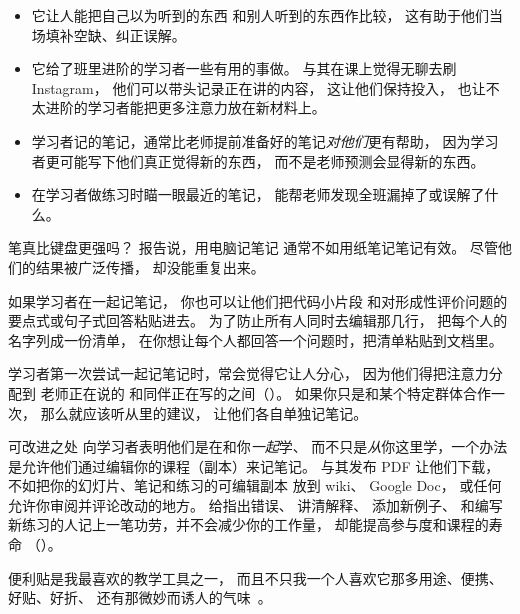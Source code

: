 \begin{itemize}

\item
  它让人能把自己以为听到的东西
  和别人听到的东西作比较，
  这有助于他们当场填补空缺、纠正误解。

\item
  它给了班里进阶的学习者一些有用的事做。
  与其在课上觉得无聊去刷 Instagram，
  他们可以带头记录正在讲的内容，
  这让他们保持投入，
  也让不太进阶的学习者能把更多注意力放在新材料上。

\item
  学习者记的笔记，通常比老师提前准备好的笔记\emph{对他们}更有帮助，
  因为学习者更可能写下他们真正觉得新的东西，
  而不是老师预测会显得新的东西。

\item
  在学习者做练习时瞄一眼最近的笔记，
  能帮老师发现全班漏掉了或误解了什么。

\end{itemize}

\begin{aside}{笔真比键盘更强吗？}
  \cite{Muel2014}报告说，用电脑记笔记
  通常不如用纸笔记笔记有效。
  尽管他们的结果被广泛传播，
  \cite{More2019}却没能重复出来。
\end{aside}

如果学习者在一起记笔记，
你也可以让他们把代码小片段
和对形成性评价问题的要点式或句子式回答粘贴进去。
为了防止所有人同时去编辑那几行，
把每个人的名字列成一份清单，
在你想让每个人都回答一个问题时，把清单粘贴到文档里。

学习者第一次尝试一起记笔记时，常会觉得它让人分心，
因为他们得把注意力分配到
老师正在说的
和同伴正在写的之间（）。
如果你只是和某个特定群体合作一次，
那么就应该听从里的建议，
让他们各自单独记笔记。

\begin{aside}{可改进之处}
  向学习者表明他们是在和你\emph{一起}学、
  而不只是\emph{从}你这里学，一个办法
  是允许他们通过编辑你的课程（副本）来记笔记。
  与其发布 PDF 让他们下载，
  不如把你的幻灯片、笔记和练习的可编辑副本
  放到 wiki、
  Google Doc，
  或任何允许你审阅并评论改动的地方。
  给指出错误、
  讲清解释、
  添加新例子、
  和编写新练习的人记上一笔功劳，并不会减少你的工作量，
  却能提高参与度和课程的寿命
  （）。
\end{aside}


便利贴是我最喜欢的教学工具之一，
而且不只我一个人喜欢它那多用途、便携、
好贴、好折、
还有那微妙而诱人的气味~\cite{Ward2015}。

